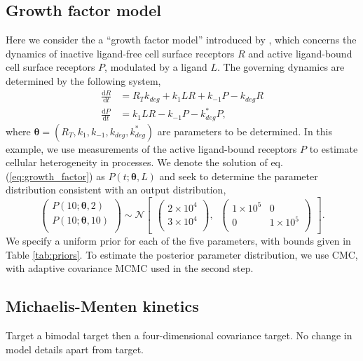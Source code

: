\documentclass[10pt,letterpaper]{article}
\begin{document}
\subsection{Growth factor model}
Here we consider the a ``growth factor model'' introduced by \cite{dixit2018maximum}, which concerns the dynamics of inactive ligand-free cell surface receptors $R$ and active ligand-bound cell surface receptors $P$, modulated by a ligand $L$. The governing dynamics are determined by the following system,
%
\begin{align}\label{eq:growth_factor}
\frac{\mathrm{d}R}{\mathrm{d}t} &= R_T k_{deg} + k_1 L R + k_{-1} P - k_{deg} R\\
\frac{\mathrm{d}P}{\mathrm{d}t} &= k_1 L R - k_{-1} P - k^*_{deg} P,
\end{align}
%
where $\boldsymbol{\theta}=(R_T, k_1, k_{-1}, k_{deg}, k^*_{deg})$ are parameters to be determined. In this example, we use measurements of the active ligand-bound receptors $P$ to estimate cellular heterogeneity in processes. We denote the solution of eq. (\ref{eq:growth_factor}) as $P(t; \boldsymbol{\theta}, L)$ and seek to determine the parameter distribution consistent with an output distribution,
%
\begin{equation}\label{eq:MM_outputDistribution}
\begin{pmatrix}
P(10; \boldsymbol{\theta}, 2)\\
P(10; \boldsymbol{\theta}, 10)\\
\end{pmatrix} \sim  \mathcal{N}
\begin{bmatrix}
\begin{pmatrix}
2\times 10^4\\
3\times 10^4\\
\end{pmatrix}, \;\;
\begin{pmatrix}
1\times 10^5 & 0\\
0 & 1\times 10^5\\
\end{pmatrix}
\end{bmatrix}.
\end{equation}
%
We specify a uniform prior for each of the five parameters, with bounds given in Table \ref{tab:priors}. To estimate the posterior parameter distribution, we use CMC, with adaptive covariance MCMC \cite{johnstone2016uncertainty} used in the second step.

\subsection{Michaelis-Menten kinetics}
Target a bimodal target then a four-dimensional covariance target. No change in model details apart from target.
\end{document}
